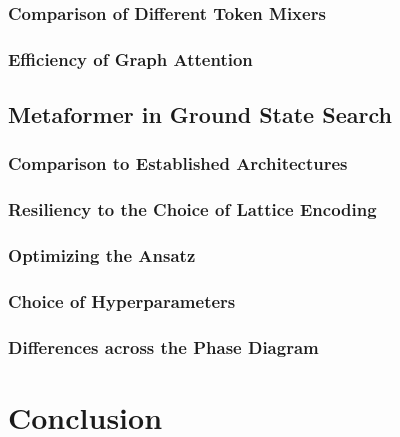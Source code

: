 \documentclass[
headings=optiontohead,              %
12pt,                               %
DIV=13,                             %
twoside=false,                      %
open=right,                         %
BCOR=00mm,                          %
toc=bibliographynumbered            %
]{scrreport}
\begin{document}
        \subsection{Comparison of Different Token Mixers}
        \label{sec:experiments-tokenmixers}
        
        \FloatBarrier
        \subsection{Efficiency of Graph Attention}
        \label{sec:experiments-efficiency-graphs}
        
        \FloatBarrier

    \section{Metaformer in Ground State Search}
    \label{sec:experiments-ground-state-search}
    
        \subsection{Comparison to Established Architectures}
        \label{sec:experiments-comparisontoestablished}
        
        \FloatBarrier
        \subsection{Resiliency to the Choice of Lattice Encoding}
        \label{sec:experiments-resiliencylatticeencoding}
        
        \FloatBarrier
        \subsection{Optimizing the Ansatz}
        \label{sec:experiments-optimizingtheansatz}
        
        \FloatBarrier
        \subsection{Choice of Hyperparameters}
        \label{sec:experiments-hyperparameters}
        
        \FloatBarrier
        \subsection{Differences across the Phase Diagram}
        \label{sec:experiments-phasecriticalpoint}
        
        \FloatBarrier

\chapter{Conclusion}
\label{sec:conclusion}

\FloatBarrier



\end{document}
